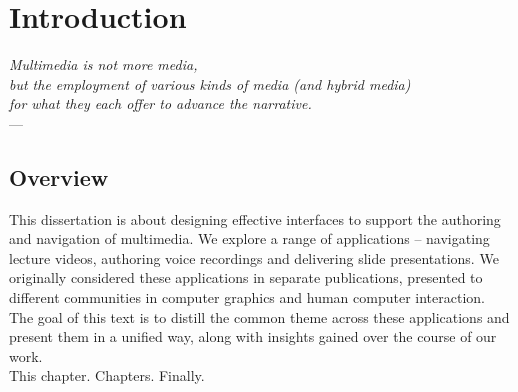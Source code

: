 
\chapter{Introduction} %

\label{ch:introduction} %

\begin{flushright}{\slshape    
Multimedia is not more media, \\ 
but the employment of various kinds of media (and hybrid media) \\ 
for what they each offer to advance the narrative.} \\ \medskip
---  \citep{ritchin:2013}
\end{flushright}

\section{Overview}
This dissertation is about designing effective interfaces to support the authoring and navigation of multimedia. We explore a range of applications -- navigating lecture videos, authoring voice recordings and delivering slide presentations. We originally considered these applications in separate publications, presented to different communities in computer graphics and human computer interaction. The goal of this text is to distill the common theme across these applications and present them in a unified way, along with insights gained over the course of our work.\\
This chapter. Chapters. Finally. 

